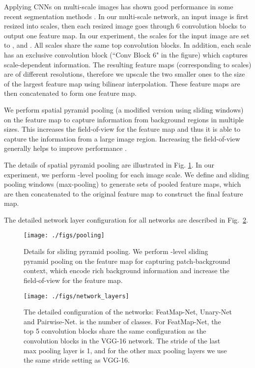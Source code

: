 Applying CNNs on multi-scale images has shown good performance in some recent segmentation methods \cite{farabet2013learning,MostajabiYS14}.
In our multi-scale network, an input image is first resized into  scales,
then each resized image goes through 6 convolution blocks to output one feature map.
In our experiment, the  scales for the input image are set to ,  and .
All scales share the same top  convolution blocks.
In addition, each scale has an exclusive convolution block (``Conv Block 6" in the figure) 
which captures scale-dependent information.
The resulting  feature maps (corresponding to  scales) are of different resolutions, therefore we  upscale the two smaller ones to the size of the largest feature map using bilinear interpolation. These feature maps are then concatenated to form one feature map.


We perform spatial pyramid pooling \cite{lazebnik2006beyond} (a modified version using sliding windows) 
on the feature map to capture information from background regions in multiple sizes.
This increases the field-of-view for the feature map and thus it is able to capture the information from a large image region.
Increasing the field-of-view generally helps to improve performance \cite{ChenPKMY14}.


The details of spatial pyramid pooling are illustrated in Fig. \ref{fig:pooling}.
In our experiment, we perform -level pooling for each image scale.
We define  and  sliding pooling windows (max-pooling) to generate  sets of pooled feature maps,
which are then concatenated to the original feature map to construct the final feature map.


The detailed network layer configuration for all networks are described in Fig.~\ref{fig:network_conf}.










\begin{figure}[t]
	\center
	\texttt{[image: ./figs/pooling]}
\caption{
Details for sliding pyramid pooling.
We perform -level sliding pyramid pooling on the feature map for capturing patch-background context, 
which encode rich background information and increase the field-of-view for the feature map.
}
\label{fig:pooling}
\end{figure}






\begin{figure}[t]
	\center
	\texttt{[image: ./figs/network\_layers]}
\caption{The detailed configuration of the networks: FeatMap-Net, Unary-Net and Pairwise-Net.
   is the number of classes.
  For FeatMap-Net, the top 5 convolution blocks share the same configuration
as the convolution blocks in the VGG-16 network. The stride of the last max pooling layer is 1, and
for the other max pooling layers we use the same stride setting as VGG-16.
}
\label{fig:network_conf}
\end{figure}







